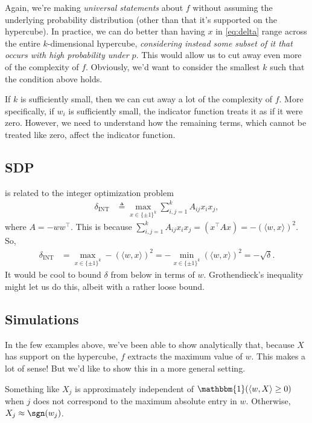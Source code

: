\documentclass{article}
\begin{document}
Again, we're making \emph{universal statements} about $f$ without assuming the underlying probability distribution (other than that it's supported on the hypercube).
In practice, we can do better than having $x$ in \cref{eq:delta} range across the entire $k$-dimensional hypercube, \emph{considering instead some subset of it that occurs with high probability under $p$}.
This would allow us to cut away even more of the complexity of $f$.
Obviously, we'd want to consider the smallest $k$ such that the condition above holds.

If $k$ is sufficiently small, then we can cut away a lot of the complexity of $f$.
More specifically, if $w_i$ is sufficiently small, the indicator function treats it as if it were zero.
However, we need to understand how the remaining terms, which cannot be treated like zero, affect the indicator function.

\subsection*{SDP}
 is related to the integer optimization problem
\begin{align*}
  \delta_\text{INT} &\triangleq \max_{x \in \{ \pm 1 \}^k} \sum_{i,j=1}^{k} A_{ij} x_i x_j,
\end{align*}
where $A = -w w^\top$.
This is because $\sum_{i,j=1}^{k} A_{ij} x_i x_j = (x^\top A x) = - (\langle w, x \rangle)^2$.
So,
\begin{align*}
  \delta_\text{INT}
  &= \max_{x \in \{ \pm 1 \}^k} - (\langle w, x \rangle)^2
  = - \min_{x \in \{ \pm 1 \}^k} (\langle w, x \rangle)^2
  = - \sqrt{\delta}.
\end{align*}
It would be cool to bound $\delta$ from below in terms of $w$.
Grothendieck's inequality might let us do this, albeit with a rather loose bound.


\subsection{Simulations}
In the few examples above, we've been able to show analytically that, because $X$ has support on the hypercube, $f$ extracts the maximum value of $w$.
This makes a lot of sense!
But we'd like to show this in a more general setting.

Something like $X_j$ is approximately independent of $\mathbbm{1}( \langle w, X \rangle \geq 0 )$ when $j$ does not correspond to the maximum absolute entry in $w$.
Otherwise, $X_j \approx \sgn(w_j)$.
\end{document}
